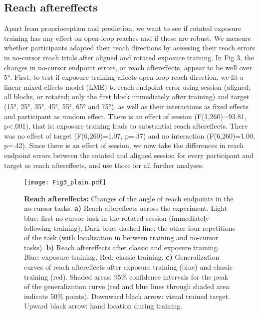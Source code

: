 \documentclass[10pt,letterpaper]{article}
\begin{document}
\subsection{Reach aftereffects}\label{reach-aftereffects-1}

Apart from proprioception and prediction, we want to see if rotated
exposure training has any effect on open-loop reaches and if these are
robust. We measure whether participants adapted their reach directions
by assessing their reach errors in no-cursor reach trials after aligned
and rotated exposure training. In Fig 3, the changes in no-cursor
endpoint errors, or reach aftereffects, appear to be well over 5°.
First, to test if exposure training affects open-loop reach direction,
we fit a linear mixed effects model (LME) to reach endpoint error using
session (aligned; all blocks, or rotated; only the first block
immediately after training) and target (15°, 25°, 35°, 45°, 55°, 65° and
75°), as well as their interactions as fixed effects and participant as
random effect. There is an effect of session (F(1,260)=93.81,
p\textless{}.001), that is: exposure training leads to substantial reach
aftereffects. There was no effect of target (F(6,260)=1.07, p=.37) and
no interaction (F(6,260)=1.00, p=.42). Since there is an effect of
session, we now take the differences in reach endpoint errors between
the rotated and aligned session for every participant and target as
reach aftereffects, and use those for all further analyses.

\begin{figure}
\centering
\texttt{[image: Fig3\_plain.pdf]}
\caption{\textbf{Reach aftereffects:} Changes of the angle of reach
endpoints in the no-cursor tasks. \textbf{a)} Reach aftereffects across
the experiment. Light blue: first no-cursor task in the rotated session
(immediately following training), Dark blue, dashed line: the other four
repetitions of the task (with localization in between training and
no-cursor tasks). \textbf{b)} Reach aftereffects after classic and
exposure training. Blue: exposure training, Red: classic training.
\textbf{c)} Generalization curves of reach aftereffects after exposure
training (blue) and classic training (red). Shaded areas: 95\%
confidence intervals for the peak of the generalization curve (red and
blue lines through shaded area indicate 50\% points). Downward black
arrow: visual trained target. Upward black arrow: hand location during
training.}
\end{figure}
\end{document}
